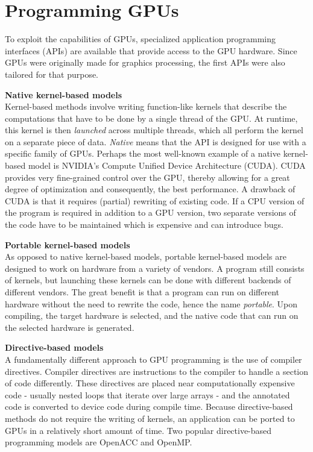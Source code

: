 \section{Programming GPUs} \label{sec:programming_gpus}
To exploit the capabilities of GPUs, specialized application programming interfaces (APIs) are available that provide access to the GPU hardware. Since GPUs were originally made for graphics processing, the first APIs were also tailored for that purpose. 

\textbf{Native kernel-based models} \\
Kernel-based methods involve writing function-like kernels that describe the computations that have to be done by a single thread of the GPU. At runtime, this kernel is then \emph{launched} across multiple threads, which all perform the kernel on a separate piece of data. \emph{Native} means that the API is designed for use with a specific family of GPUs. Perhaps the most well-known example of a native kernel-based model is NVIDIA's Compute Unified Device Architecture (CUDA). CUDA provides very fine-grained control over the GPU, thereby allowing for a great degree of optimization and consequently, the best performance. A drawback of CUDA is that it requires (partial) rewriting of existing code. If a CPU version of the program is required in addition to a GPU version, two separate versions of the code have to be maintained which is expensive and can introduce bugs. 

\textbf{Portable kernel-based models} \\
As opposed to native kernel-based models, portable kernel-based models are designed to work on hardware from a variety of vendors. A program still consists of kernels, but launching these kernels can be done with different backends of different vendors. The great benefit is that a program can run on different hardware without the need to rewrite the code, hence the name \emph{portable}. Upon compiling, the target hardware is selected, and the native code that can run on the selected hardware is generated. 

\textbf{Directive-based models} \\
A fundamentally different approach to GPU programming is the use of compiler directives. Compiler directives are instructions to the compiler to handle a section of code differently. These directives are placed near computationally expensive code - usually nested loops that iterate over large arrays - and the annotated code is converted to device code during compile time. Because directive-based methods do not require the writing of kernels, an application can be ported to GPUs in a relatively short amount of time. Two popular directive-based programming models are OpenACC and OpenMP.

